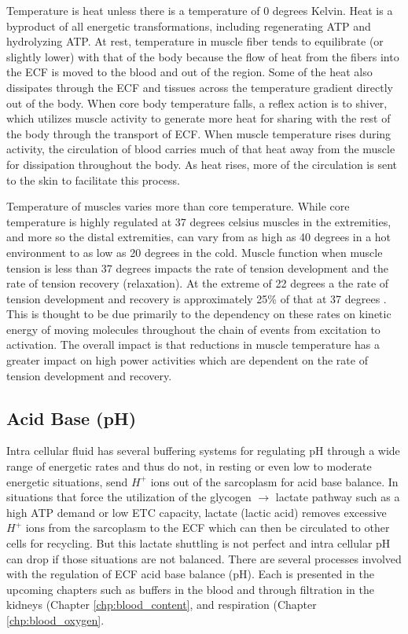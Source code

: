 Temperature is heat unless there is a temperature of 0 degrees Kelvin. Heat is a byproduct of all energetic transformations, including regenerating ATP and hydrolyzing ATP. At rest, temperature in muscle fiber tends to equilibrate (or slightly lower) with that of the body because the flow of heat from the fibers into the ECF is moved to the blood and out of the region. Some of the heat also dissipates through the ECF and tissues across the temperature gradient directly out of the body. When core body temperature falls, a reflex action is to shiver, which utilizes muscle activity to generate more heat for sharing with the rest of the body through the transport of ECF. When muscle temperature rises during activity, the circulation of blood carries much of that heat away from the muscle for dissipation throughout the body. As heat rises, more of the circulation is sent to the skin to facilitate this process.

Temperature of muscles varies more than core temperature. While core temperature is highly regulated at 37 degrees celsius muscles in the extremities, and more so the distal extremities, can vary from as high as 40 degrees in a hot environment to as low as 20 degrees in the cold. Muscle function when muscle tension is less than 37 degrees impacts the rate of tension development and the rate of tension recovery (relaxation). At the extreme of 22 degrees a the rate of tension development and recovery is approximately 25\% of that at 37 degrees \cite{jones_skeletal_2006}. This is thought to be due primarily to the dependency on these rates on kinetic energy of moving molecules throughout the chain of events from excitation to activation. The overall impact is that reductions in muscle temperature has a greater impact on high power activities which are dependent on the rate of tension development and recovery.

\subsection{Acid Base (pH)}

Intra cellular fluid has several buffering systems for regulating pH through a wide range of energetic rates and thus do not, in resting or even low to moderate energetic situations, send $H^+$ ions out of the sarcoplasm for acid base balance. In situations that force the utilization of the glycogen $\rightarrow$ lactate pathway such as a high ATP demand or low ETC capacity, lactate (lactic acid) removes excessive $H^+$ ions from the sarcoplasm to the ECF which can then be circulated to other cells for recycling. But this lactate shuttling is not perfect and intra cellular pH can drop if those situations are not balanced.
There are several processes involved with the regulation of ECF acid base balance (pH). Each is presented in the upcoming chapters such as buffers in the blood and through filtration in the kidneys (Chapter \ref{chp:blood_content}, and respiration (Chapter \ref{chp:blood_oxygen}.


